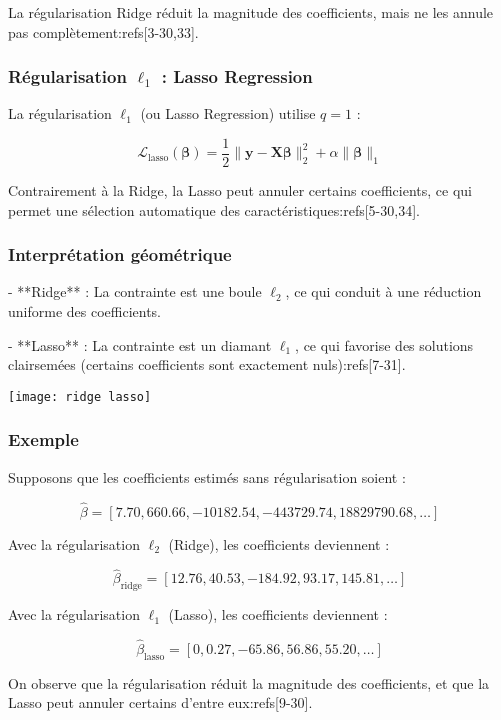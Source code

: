 \documentclass[10pt,a4paper]{article}
\begin{document}
La régularisation Ridge réduit la magnitude des coefficients, mais ne les annule pas complètement:refs[3-30,33].

\subsubsection*{Régularisation $\ell_1$ : Lasso Regression}

La régularisation $\ell_1$ (ou Lasso Regression) utilise $q=1$ :

$$
\mathcal{L}_{\text{lasso}}(\boldsymbol{\beta}) = \frac{1}{2}\|\mathbf{y} - \mathbf{X} \boldsymbol{\beta}\|_{2}^{2} + \alpha \|\boldsymbol{\beta}\|_{1}
$$

Contrairement à la Ridge, la Lasso peut annuler certains coefficients, ce qui permet une sélection automatique des caractéristiques:refs[5-30,34].

\subsubsection*{Interprétation géométrique}

- **Ridge** : La contrainte est une boule $\ell_2$, ce qui conduit à une réduction uniforme des coefficients.

- **Lasso** : La contrainte est un diamant $\ell_1$, ce qui favorise des solutions clairsemées (certains coefficients sont exactement nuls):refs[7-31].

\texttt{[image: ridge lasso]}

\subsubsection*{Exemple}

Supposons que les coefficients estimés sans régularisation soient :

$$
\hat{\beta} = [7.70, 660.66, -10182.54, -443729.74, 18829790.68, \ldots]
$$

Avec la régularisation $\ell_2$ (Ridge), les coefficients deviennent :

$$
\hat{\beta}_{\text{ridge}} = [12.76, 40.53, -184.92, 93.17, 145.81, \ldots]
$$

Avec la régularisation $\ell_1$ (Lasso), les coefficients deviennent :

$$
\hat{\beta}_{\text{lasso}} = [0, 0.27, -65.86, 56.86, 55.20, \ldots]
$$

On observe que la régularisation réduit la magnitude des coefficients, et que la Lasso peut annuler certains d'entre eux:refs[9-30].
\end{document}
